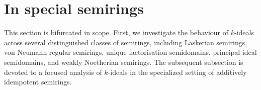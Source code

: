 \documentclass[11pt,english]{amsart}
\newcommand{\add}[1]{\textcolor{Red}{#1}}
\newtheorem{theorem}{Theorem}[section]
\theoremstyle{definition}
\newtheorem{definition}[theorem]{Definition}
\numberwithin{equation}{section}
\begin{document}









\smallskip

\section{In special semirings}\label{Section 6: k-ideals and its variants in special semirings}
This section is bifurcated in scope. First, we investigate the behaviour of 
$k$-ideals across several distinguished  classes of semirings, including Laskerian semirings, von Neumann regular semirings, unique factorisation semidomains, principal ideal semidomains, and weakly Noetherian semirings. The subsequent subsection is devoted to a focused analysis of 
$k$-ideals in the specialized setting of additively idempotent semirings.
\end{document}
